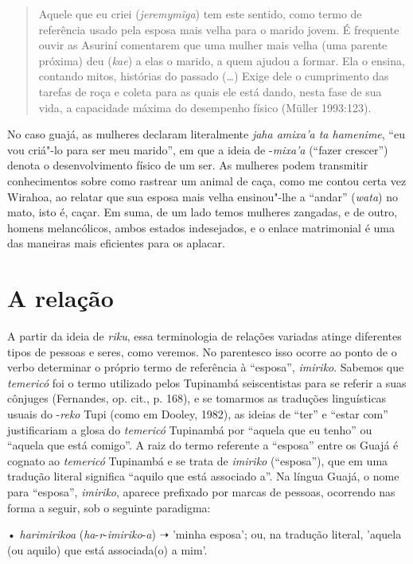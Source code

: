 \begin{quote}
Aquele que eu criei (\emph{jeremymĩga}) tem este sentido, como termo de
referência usado pela esposa mais velha para o marido jovem. É frequente
ouvir as Asuriní comentarem que uma mulher mais velha (uma parente
próxima) deu (\emph{kae}) a elas o marido, a quem ajudou a formar. Ela o
ensina, contando mitos, histórias do passado (\ldots{}) Exige dele o
cumprimento das tarefas de roça e coleta para as quais ele está dando,
nesta fase de sua vida, a capacidade máxima do desempenho físico (Müller
1993:123).
\end{quote}

No caso guajá, as mulheres declaram literalmente \emph{jaha amixa'a ta
hamenime}, ``eu vou criá"-lo para ser meu marido'', em que a ideia de
-\emph{mixa'a} (``fazer crescer'') denota o desenvolvimento físico de um
ser. As mulheres podem transmitir conhecimentos sobre como rastrear um
animal de caça, como me contou certa vez Wirahoa, ao relatar que sua
esposa mais velha ensinou"-lhe a ``andar'' (\emph{wata}) no mato, isto é,
caçar. Em suma, de um lado temos mulheres zangadas, e de outro, homens
melancólicos, ambos estados indesejados, e o enlace matrimonial é uma
das maneiras mais eficientes para os aplacar.

\section{A relação}\label{a-relauxe7uxe3o}

A partir da ideia de \emph{riku}, essa terminologia de relações variadas
atinge diferentes tipos de pessoas e seres, como veremos. No parentesco
isso ocorre ao ponto de o verbo determinar o próprio termo de referência
à ``esposa'', \emph{imiriko}. Sabemos que \emph{temericó} foi o termo
utilizado pelos Tupinambá seiscentistas para se referir a suas cônjuges
(Fernandes, op. cit., p. 168), e se tomarmos as traduções linguísticas
usuais do -\emph{reko} Tupi (como em Dooley, 1982), as ideias de ``ter'' e
``estar com'' justificariam a glosa do \emph{temericó} Tupinambá por
``aquela que eu tenho'' ou ``aquela que está comigo''. A raiz do termo
referente a ``esposa'' entre os Guajá é cognato ao \emph{temericó}
Tupinambá e se trata de \emph{imiriko} (``esposa''), que em uma tradução
literal significa ``aquilo que está associado a''. Na língua Guajá, o nome
para ``esposa'', \emph{imiriko}, aparece prefixado por marcas de pessoas,
ocorrendo nas forma a seguir, sob o seguinte paradigma:

• \emph{harimirikoa} (\emph{ha}-\emph{r}-\emph{imiriko}-\emph{a}) ➝
'minha esposa'; ou, na tradução literal, 'aquela (ou aquilo) que está
associada(o) a mim'.

